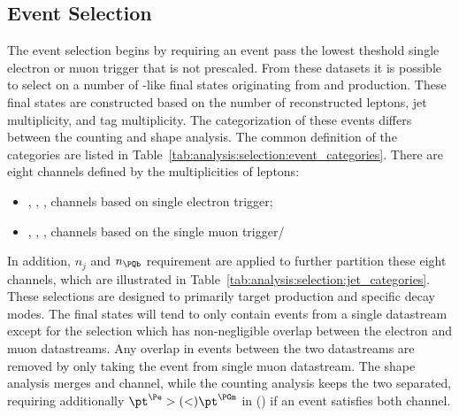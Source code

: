




\FloatBarrier

\subsection{Event Selection}
\label{sec:analysis:selection:event}

The event selection begins by requiring an event pass the lowest \pt theshold single electron or muon trigger that is not prescaled. From these datasets it is possible to select on a number of \WW-like final states originating from \ttbar and \tW production.  These final states are constructed based on the number of reconstructed leptons, jet multiplicity, and \PQb tag multiplicity.  The categorization of these events differs between the counting and shape analysis.  The common definition of the categories are listed in Table~\ref{tab:analysis:selection:event_categories}. There are eight channels defined by the multiplicities of leptons: 
\begin{itemize}
    \item \cee, \cem, \cet, \ceh channels based on single electron trigger; 
    \item \cme, \cmm, \cmt, \cmh channels based on the single muon trigger/
\end{itemize}
\noindent In addition, $n_j$ and $n_\PQb$ requirement are applied to further partition these eight channels, which are illustrated in Table~\ref{tab:analysis:selection:jet_categories}. These selections are designed to primarily target \ttbar production and specific \PW decay modes. The final states will tend to only contain events from a single datastream except for the \cem selection which has non-negligible overlap between the electron and muon datastreams. Any overlap in events between the two datastreams are removed by only taking the event from single muon datastream. The shape analysis merges \cem and \cme channel, while the counting analysis keeps the two separated, requiring additionally $\pt^\Pe  >(<) \pt^\PGm$ in \cem (\cme) if an event satisfies both channel.



